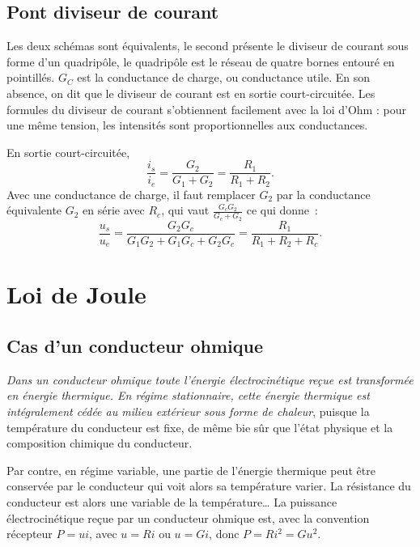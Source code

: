 \subsection{Pont diviseur de courant}
Les deux schémas sont équivalents, le second présente le diviseur de courant sous forme d'un quadripôle, le quadripôle est le réseau de quatre bornes entouré en pointillés. \(G_C\) est la conductance de charge, ou conductance utile. En son absence, on dit que le diviseur de courant est en sortie court-circuitée. Les formules du diviseur de courant s'obtiennent facilement avec la loi d'Ohm : pour une même tension, les intensités sont proportionnelles aux conductances.

En sortie court-circuitée,
\begin{equation}\label{eq:pontdiviseuri}
\frac{i_s}{i_e} = \frac{G_2}{G_1+G_2} = \frac{R_1}{R_1+R_2}.
\end{equation}
Avec une conductance de charge, il faut remplacer \(G_2\) par la conductance équivalente \(G_2\) en série avec \(R_c\), qui vaut \(\frac{G_cG_2}{G_c+G_2}\) ce qui donne~:
\begin{equation}\label{eq:diviseuri_gc}
\frac{u_s}{u_e} = \frac{G_2G_c}{G_1G_2+G_1G_c+G_2G_c} = \frac{R_1}{R_1+R_2+R_c}.
\end{equation}

\section{Loi de Joule}
\subsection{Cas d'un conducteur ohmique}

\emph{Dans un conducteur ohmique toute l'énergie électrocinétique reçue est transformée en énergie thermique. En régime stationnaire, cette énergie thermique est intégralement cédée au milieu extérieur sous forme de chaleur}, puisque la température du conducteur est fixe, de même bie sûr que l'état physique et la composition chimique du conducteur.

Par contre, en régime variable, une partie de l'énergie thermique peut être conservée par le conducteur qui voit alors sa température varier. La résistance du conducteur est alors une variable de la température\ldots{} La puissance électrocinétique reçue par un conducteur ohmique est, avec la convention récepteur \(P = ui\), avec \(u=Ri\) ou \(u=Gi\), donc \(P=R i^2 = G u^2\).

